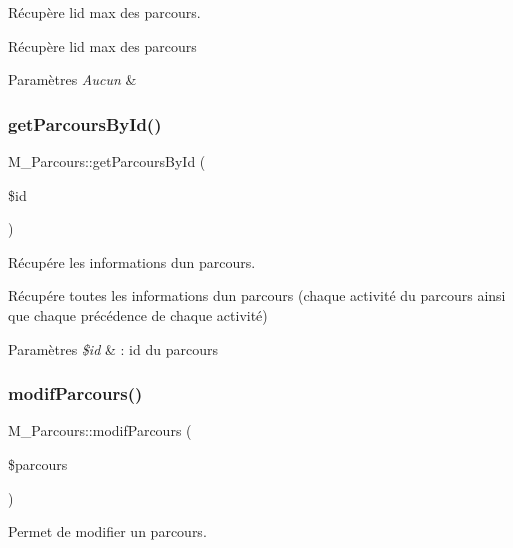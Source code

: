 Récupère l\textquotesingle{}id max des parcours. 

Récupère l\textquotesingle{}id max des parcours 
\begin{DoxyParams}{Paramètres}
{\em Aucun} & \\
\hline
\end{DoxyParams}
\mbox{\label{class_m___parcours_a23eb09937940c4ec4432532459b076f0}} 
\subsubsection{\texorpdfstring{get\+Parcours\+By\+Id()}{getParcoursById()}}
{\footnotesize\ttfamily M\+\_\+\+Parcours\+::get\+Parcours\+By\+Id (\begin{DoxyParamCaption}\item[{}]{\$id }\end{DoxyParamCaption})}



Récupére les informations d\textquotesingle{}un parcours. 

Récupére toutes les informations d\textquotesingle{}un parcours (chaque activité du parcours ainsi que chaque précédence de chaque activité) 
\begin{DoxyParams}{Paramètres}
{\em \$id} & \+: id du parcours \\
\hline
\end{DoxyParams}
\mbox{\label{class_m___parcours_a6ce48cebbfa02280dd258b5b8f9e7357}} 
\subsubsection{\texorpdfstring{modif\+Parcours()}{modifParcours()}}
{\footnotesize\ttfamily M\+\_\+\+Parcours\+::modif\+Parcours (\begin{DoxyParamCaption}\item[{}]{\$parcours }\end{DoxyParamCaption})}



Permet de modifier un parcours. 

